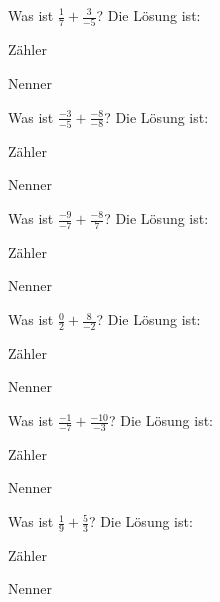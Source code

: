 \documentclass{ximera}
\begin{document}
\begin{shuffle}
\begin{question}
Was ist $\frac{1}{7} + \frac{3}{-5}$?
Die Lösung ist:
\begin{solution}
Zähler 
\end{solution}
\begin{solution}
Nenner 
\end{solution}
\end{question}


\begin{question}
Was ist $\frac{-3}{-5} + \frac{-8}{-8}$?
Die Lösung ist:
\begin{solution}
Zähler 
\end{solution}
\begin{solution}
Nenner 
\end{solution}
\end{question}


\begin{question}
Was ist $\frac{-9}{-7} + \frac{-8}{7}$?
Die Lösung ist:
\begin{solution}
Zähler 
\end{solution}
\begin{solution}
Nenner 
\end{solution}
\end{question}


\begin{question}
Was ist $\frac{0}{2} + \frac{8}{-2}$?
Die Lösung ist:
\begin{solution}
Zähler 
\end{solution}
\begin{solution}
Nenner 
\end{solution}
\end{question}


\begin{question}
Was ist $\frac{-1}{-7} + \frac{-10}{-3}$?
Die Lösung ist:
\begin{solution}
Zähler 
\end{solution}
\begin{solution}
Nenner 
\end{solution}
\end{question}


\begin{question}
Was ist $\frac{1}{9} + \frac{5}{3}$?
Die Lösung ist:
\begin{solution}
Zähler 
\end{solution}
\begin{solution}
Nenner 
\end{solution}
\end{question}



\end{shuffle}
\end{document}
